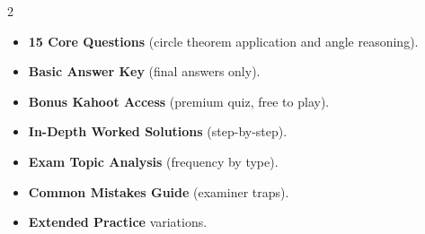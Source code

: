 \documentclass[11pt,a4paper]{article}
\newcommand{\FullReleaseDate}{April 30, 2026}
\begin{document}
\vspace{8pt}

\begin{multicols}{2}
  \begin{tcolorbox}[card, title=\sffamily\bfseries\textcolor{white}{\faHandPointDown\ TODAY (Simplified Version)}, colbacktitle=mainblue, boxed title style={sharp corners, boxrule=0pt}]
    \begin{itemize}[leftmargin=1.2em, itemsep=2pt]
      \item \small \textbf{15 Core Questions} (circle theorem application and angle reasoning).
      \item \small \textbf{Basic Answer Key} (final answers only).
      \item \small \textbf{Bonus Kahoot Access} (premium quiz, free to play).
    \end{itemize}
  \end{tcolorbox}

  \columnbreak

  \begin{tcolorbox}[card, title=\sffamily\bfseries\textcolor{white}{\faRocket\ ON \FullReleaseDate\ (Full Upgrade)}, colbacktitle=mainblue, boxed title style={sharp corners, boxrule=0pt}]
    \begin{itemize}[leftmargin=1.2em, itemsep=2pt]
      \item \small \textbf{In-Depth Worked Solutions} (step-by-step).
      \item \small \textbf{Exam Topic Analysis} (frequency by type).
      \item \small \textbf{Common Mistakes Guide} (examiner traps).
      \item \small \textbf{Extended Practice} variations.
    \end{itemize}
  \end{tcolorbox}
\end{multicols}
\end{document}

